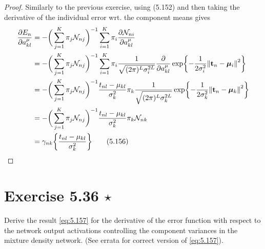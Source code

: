 \begin{proof}
    Similarly to the previous exercise, using (5.152) and
    then taking the derivative of the individual error wrt. the component
    means gives
    \begin{align*}
        \pdv{E_n}{a_{kl}^\mu}
        &= -\bigg(\sum_{j=1}^{K} \pi_j \mathcal{N}_{nj}\bigg)^{-1}
        \sum_{i=1}^{K} \pi_i \pdv{\mathcal{N}_{ni}}{a_{kl}^\mu} \\
        &= -\bigg(\sum_{j=1}^{K} \pi_j \mathcal{N}_{nj}\bigg)^{-1}
        \sum_{i=1}^{K} \pi_i \frac{1}{\sqrt{(2\pi)^L \sigma_i^{2L}}} \pdv{a_{kl}^\mu}
        \exp{-\frac{1}{2\sigma_i^2} \norm{\mathbf{t}_n - \bm{\mu}_i}^2} \\
        &= -\bigg(\sum_{j=1}^{K} \pi_j \mathcal{N}_{nj}\bigg)^{-1}
        \frac{t_{nl} - \mu_{kl}}{\sigma_k^2} \pi_k \frac{1}{\sqrt{(2\pi)^L \sigma_k^{2L}}} 
        \exp{-\frac{1}{2\sigma_k^2} \norm{\mathbf{t}_n - \bm{\mu}_k}^2} \\
        &= -\bigg(\sum_{j=1}^{K} \pi_j \mathcal{N}_{nj}\bigg)^{-1}
        \frac{t_{nl} - \mu_{kl}}{\sigma_k^2} \pi_k\mathcal{N}_{nk} \\
        &= \gamma_{nk} \bigg\{\frac{t_{nl} - \mu_{kl}}{\sigma_k^2}\bigg\} 
        \tag{5.156}\label{eq:5.156}
    \end{align*}
\end{proof}

\section*{Exercise 5.36 $\star$}
Derive the result \eqref{eq:5.157} for the derivative of the error
function with respect to the network output activations controlling
the component variances in the mixture density network.
(See errata for correct version of \eqref{eq:5.157}).

\vspace{1em}

